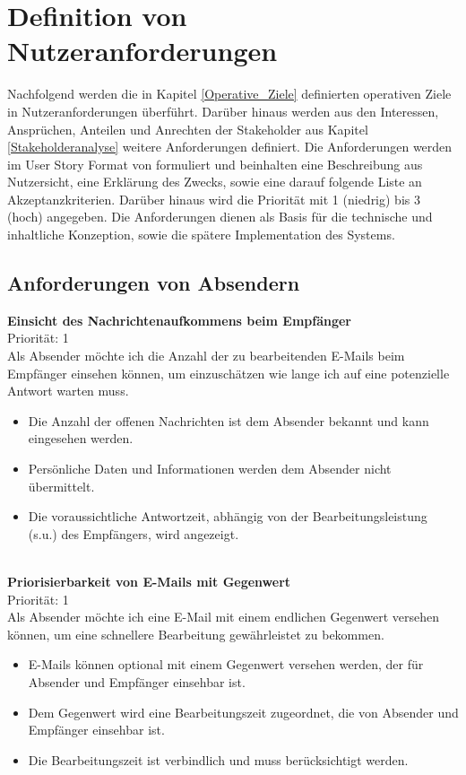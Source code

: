 
\chapter{Definition von Nutzeranforderungen}
\label{Definition_von_Nutzeranforderungen}

Nachfolgend werden die in Kapitel \ref{Operative_Ziele} definierten operativen Ziele in Nutzeranforderungen überführt. Darüber hinaus werden aus den Interessen, Ansprüchen, Anteilen und Anrechten der Stakeholder aus Kapitel \ref{Stakeholderanalyse} weitere Anforderungen definiert. Die Anforderungen werden im User Story Format von \cite{Cohn2004} formuliert und beinhalten eine Beschreibung aus Nutzersicht, eine Erklärung des Zwecks, sowie eine darauf folgende Liste an Akzeptanzkriterien. Darüber hinaus wird die Priorität mit 1 (niedrig) bis 3 (hoch) angegeben. Die Anforderungen dienen als Basis für die technische und inhaltliche Konzeption, sowie die spätere Implementation des Systems.



\section{Anforderungen von Absendern}
\label{Anforderungen_von_Absendern}

\textbf{Einsicht des Nachrichtenaufkommens beim Empfänger} \\
Priorität: 1 \\
Als Absender möchte ich die Anzahl der zu bearbeitenden E-Mails beim Empfänger einsehen können, um einzuschätzen wie lange ich auf eine potenzielle Antwort warten muss.
\begin{itemize}
    \item Die Anzahl der offenen Nachrichten ist dem Absender bekannt und kann eingesehen werden.
    \item Persönliche Daten und Informationen werden dem Absender nicht übermittelt.
    \item Die voraussichtliche Antwortzeit, abhängig von der Bearbeitungsleistung (s.u.) des Empfängers, wird angezeigt.
\end{itemize}

\noindent
\\ \textbf{Priorisierbarkeit von E-Mails mit Gegenwert} \\
Priorität: 1 \\
Als Absender möchte ich eine E-Mail mit einem endlichen Gegenwert versehen können, um eine schnellere Bearbeitung gewährleistet zu bekommen.
\begin{itemize}
    \item E-Mails können optional mit einem Gegenwert versehen werden, der für Absender und Empfänger einsehbar ist.
    \item Dem Gegenwert wird eine Bearbeitungszeit zugeordnet, die von Absender und Empfänger einsehbar ist.
    \item Die Bearbeitungszeit ist verbindlich und muss berücksichtigt werden.
\end{itemize}


